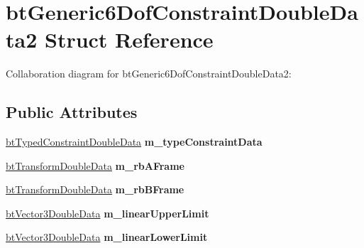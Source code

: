 \hypertarget{structbt_generic6_dof_constraint_double_data2}{\section{bt\+Generic6\+Dof\+Constraint\+Double\+Data2 Struct Reference}
\label{structbt_generic6_dof_constraint_double_data2}
}


Collaboration diagram for bt\+Generic6\+Dof\+Constraint\+Double\+Data2\+:
\subsection*{Public Attributes}
\begin{DoxyCompactItemize}
\item 
\hypertarget{structbt_generic6_dof_constraint_double_data2_a2c3bc05b720fd0e5fde03bbca3813316}{\hyperlink{structbt_typed_constraint_double_data}{bt\+Typed\+Constraint\+Double\+Data} {\bfseries m\+\_\+type\+Constraint\+Data}}\label{structbt_generic6_dof_constraint_double_data2_a2c3bc05b720fd0e5fde03bbca3813316}

\item 
\hypertarget{structbt_generic6_dof_constraint_double_data2_a4302fd9a60855c7f8eb6ec71319f1219}{\hyperlink{structbt_transform_double_data}{bt\+Transform\+Double\+Data} {\bfseries m\+\_\+rb\+A\+Frame}}\label{structbt_generic6_dof_constraint_double_data2_a4302fd9a60855c7f8eb6ec71319f1219}

\item 
\hypertarget{structbt_generic6_dof_constraint_double_data2_aaae9eec42be5044c4bebfadf62554661}{\hyperlink{structbt_transform_double_data}{bt\+Transform\+Double\+Data} {\bfseries m\+\_\+rb\+B\+Frame}}\label{structbt_generic6_dof_constraint_double_data2_aaae9eec42be5044c4bebfadf62554661}

\item 
\hypertarget{structbt_generic6_dof_constraint_double_data2_a05d9876c5a7efcadcb8124a3e9f4c17e}{\hyperlink{structbt_vector3_double_data}{bt\+Vector3\+Double\+Data} {\bfseries m\+\_\+linear\+Upper\+Limit}}\label{structbt_generic6_dof_constraint_double_data2_a05d9876c5a7efcadcb8124a3e9f4c17e}

\item 
\hypertarget{structbt_generic6_dof_constraint_double_data2_a43b141129be34272dae0a3ca2d9ed629}{\hyperlink{structbt_vector3_double_data}{bt\+Vector3\+Double\+Data} {\bfseries m\+\_\+linear\+Lower\+Limit}}\label{structbt_generic6_dof_constraint_double_data2_a43b141129be34272dae0a3ca2d9ed629}


\end{DoxyCompactItemize}
